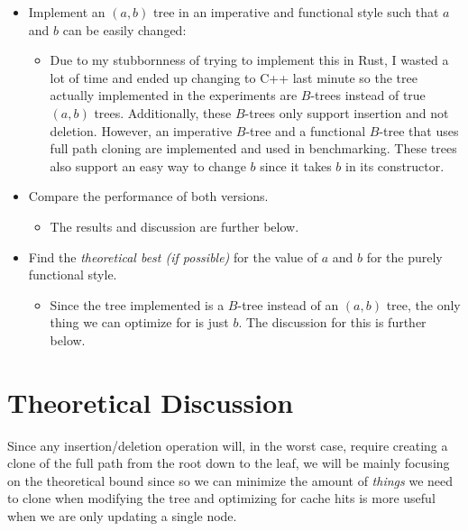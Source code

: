 \documentclass{article}
\begin{document}
\begin{itemize}
    \item Implement an $(a, b)$ tree in an imperative and functional style such that 
        $a$ and $b$ can be easily changed:
        \begin{itemize}
            \item  Due to my stubbornness of trying to
                implement this in Rust, I wasted a lot of time and ended up changing to
                C++ last minute so the tree actually implemented in the experiments are
                $B$-trees instead of true $(a, b)$ trees. Additionally, these $B$-trees
                only support insertion and not deletion. However, an imperative $B$-tree
                and a functional $B$-tree that uses full path cloning are implemented and
                used in benchmarking. These trees also support an easy way to change $b$
                since it takes $b$ in its constructor.
        \end{itemize}

    \item Compare the performance of both versions.
        \begin{itemize}
            \item The results and discussion are further below.
        \end{itemize}

    \item Find the \textit{theoretical best (if possible)} for the value of $a$ and $b$
        for the purely functional style.
        \begin{itemize}
            \item Since the tree implemented is a $B$-tree instead of an $(a, b)$ tree, the only
                thing we can optimize for is just $b$. The discussion for this is further below.
        \end{itemize}
\end{itemize}

\section{Theoretical Discussion}

Since any insertion/deletion operation will, in the worst case, require creating a clone of the
full path from the root down to the leaf, we will be mainly focusing on the theoretical bound since
so we can minimize the amount of \textit{things} we need to clone when modifying the tree and
optimizing for cache hits is more useful when we are only updating a single node.
\end{document}
